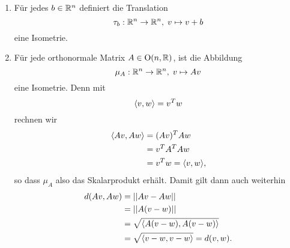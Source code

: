 \documentclass{book}
\begin{document}
\begin{exas}
    \label{exas:bewegungen}
    \begin{enumerate}
        \item {}Für jedes $b \in \mathbb{R}^n$ definiert die Translation
            \[
                \tau_b: \mathbb{R}^n \to \mathbb{R}^n, \; v \mapsto v + b
            \]
            eine Isometrie. 
        \item {}Für jede orthonormale Matrix $A \in \operatorname{O}(n,\mathbb{R})$, ist die Abbildung
            \[
                \mu_A: \mathbb{R}^n \to \mathbb{R}^n, \; v \mapsto Av
            \]
            eine Isometrie. Denn mit
            \[
                \langle v,w \rangle = v^T w
            \]
            rechnen wir
            \begin{align*}
                \langle Av,Aw \rangle &= (Av)^TAw \\
                           &= v^T A^T A w\\
                           &= v^T w = \langle v,w \rangle,
            \end{align*}
            so dass $\mu_A$ also das Skalarprodukt erhält. Damit gilt dann auch weiterhin
            \begin{align*}
                d(Av,Aw) &= || Av - Aw || \\
                         &= || A(v-w) ||\\
                         &= \sqrt{\langle A(v-w),A(v-w) \rangle}\\
                         &= \sqrt{\langle v-w,v-w \rangle} = d(v,w).
            \end{align*}
    \end{enumerate}
\end{exas}
\end{document}
